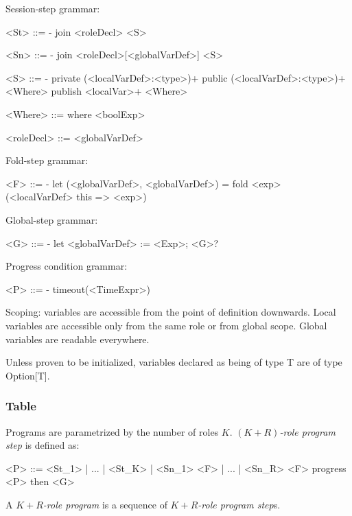 \documentclass[acmsmall,review,anonymous]{acmart}\settopmatter{printfolios=true}
\begin{document}
Session-step grammar:

\begin{grammar}
	<St> ::=  -
		\alt join <roleDecl> %
		\alt <S>

	<Sn> ::= -
		\alt join <roleDecl>[<globalVarDef>] %
		\alt <S>
	
	<S>  ::= -
		\alt private (<localVarDef>:<type>)+
        \alt public (<localVarDef>:<type>)+ <Where>
		\alt publish <localVar>+ <Where>
	
	<Where> ::= where <boolExp>
	
	<roleDecl> ::= <globalVarDef>
\end{grammar}

Fold-step grammar:

\begin{grammar}
	<F> ::= -
		\alt let (<globalVarDef>, <globalVarDef>) = fold <exp> (<localVarDef> this => <exp>)  %
\end{grammar}

Global-step grammar:
\begin{grammar}
	<G> ::= -
		\alt let <globalVarDef> := <Exp>; <G>?
\end{grammar}

Progress condition grammar:
\begin{grammar}
	<P> ::= -
		\alt timeout(<TimeExpr>)
\end{grammar}

Scoping: variables are accessible from the point of definition downwards.
Local variables are accessible only from the same role or from global scope.
Global variables are readable everywhere.

Unless proven to be initialized, variables declared as being of type T are of type Option[T].

\subsubsection{Table}
Programs are parametrized by the number of roles $K$. \emph{$(K+R)$-role program step} is defined as:

\begin{grammar}
	<P> ::= <St_1> | ... | <St_K> | <Sn_1> <F> | ... | <Sn_R> <F> progress <P> then <G>
\end{grammar}

A \emph{$K+R$-role program} is a sequence of \emph{$K+R$-role program step}s.
\end{document}
